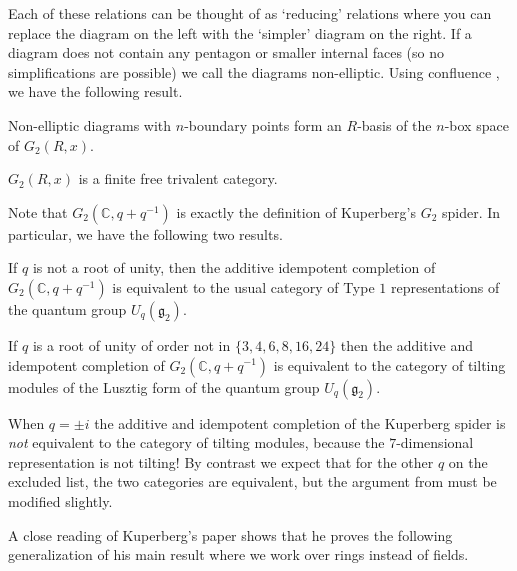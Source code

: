 \documentclass[12pt]{amsart}
\begin{document}
Each of these relations can be thought of as `reducing' relations where you can replace the diagram on the left with the `simpler' diagram on the right. If a diagram does not contain any pentagon or smaller internal faces (so no simplifications are possible) we call the diagrams non-elliptic. Using confluence \cite{MR2308953}, we have the following result.

\begin{proposition}
    Non-elliptic diagrams with $n$-boundary points form an $R$-basis of the $n$-box space of $G_2(R,x)$.
\end{proposition}

\begin{corollary}
    $G_2(R,x)$ is a finite free trivalent category.
\end{corollary}

Note that $G_2(\mathbb{C},q+q^{-1})$ is exactly the definition of Kuperberg's $G_2$ spider. In particular, we have the following two results. 

\begin{theorem}\cite{MR1403861}
    If $q$ is not a root of unity, then the additive idempotent completion of $G_2(\mathbb{C},q+q^{-1})$ is equivalent to the usual category of Type $1$ representations of the quantum group $U_q(\mathfrak{g}_2).$
\end{theorem}

\begin{theorem}\cite{OstrikSnyderG2}
    If $q$ is a root of unity of order not in $\{3,4,6,8,16,24\}$ then the additive and idempotent completion of $G_2(\mathbb{C},q+q^{-1})$ is equivalent to the category of tilting modules of the Lusztig form of the quantum group $U_q(\mathfrak{g}_2).$
\end{theorem}

\begin{remark}
    When $q = \pm i$ the additive and idempotent completion of the Kuperberg spider is \emph{not} equivalent to the category of tilting modules, because the $7$-dimensional representation is not tilting! By contrast we expect that for the other $q$ on the excluded list, the two categories are equivalent, but the argument from \cite{OstrikSnyderG2} must be modified slightly.
\end{remark}

A close reading of Kuperberg's paper \cite{MR1265145} shows that he proves the following generalization of his main result where we work over rings instead of fields.
\end{document}
